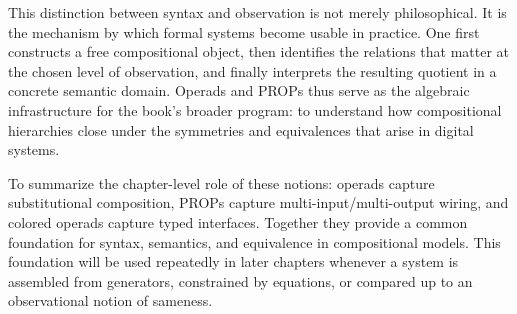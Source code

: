 \documentclass[11pt]{article}
\begin{document}
This distinction between syntax and observation is not merely philosophical. It is the mechanism by which formal systems become usable in practice. One first constructs a free compositional object, then identifies the relations that matter at the chosen level of observation, and finally interprets the resulting quotient in a concrete semantic domain. Operads and PROPs thus serve as the algebraic infrastructure for the book’s broader program: to understand how compositional hierarchies close under the symmetries and equivalences that arise in digital systems.

To summarize the chapter-level role of these notions: operads capture substitutional composition, PROPs capture multi-input/multi-output wiring, and colored operads capture typed interfaces. Together they provide a common foundation for syntax, semantics, and equivalence in compositional models. This foundation will be used repeatedly in later chapters whenever a system is assembled from generators, constrained by equations, or compared up to an observational notion of sameness.
\end{document}
